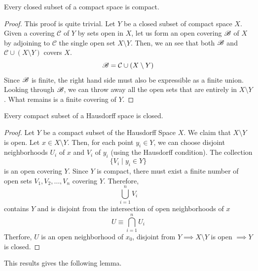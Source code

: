     \begin{theorem}
      Every closed subset of a compact space is compact. 
    \end{theorem}
    \begin{proof}
      This proof is quite trivial. Let $Y$ be a closed subset of compact space $X$. Given a covering $\mathcal{C}$ of $Y$ by sets open in $X$, let us form an open covering $\operatorname{\mathscr{B}}$ of $X$ by adjoining to $\mathcal{C}$ the single open set $X \setminus Y$. Then, we an see that both $\operatorname{\mathscr{B}}$ and $\mathcal{C} \cup (X \setminus Y)$ covers $X$. 
      \begin{equation}
        \operatorname{\mathscr{B}} = \mathcal{C} \cup (X \setminus Y)
      \end{equation}
      Since $\operatorname{\mathscr{B}}$ is finite, the right hand side must also be expressible as a finite union. Looking through $\operatorname{\mathscr{B}}$, we can throw away all the open sets that are entirely in $X \setminus Y$. What remains is a finite covering of $Y$. 
    \end{proof}

    \begin{theorem}
      Every compact subset of a Hausdorff space is closed. 
    \end{theorem}
    \begin{proof}
      Let $Y$ be a compact subset of the Hausdorff Space $X$. We claim that $X \setminus Y$ is open. Let $x \in X \setminus Y$. Then, for each point $y_i \in Y$, we can choose disjoint neighborhoods $U_i$ of $x$ and $V_i$ of $y_i$ (using the Hausdorff condition). The collection 
      \begin{equation}
        \{V_i \; | \; y_i \in Y\}
      \end{equation}
      is an open covering $Y$. Since $Y$ is compact, there must exist a finite number of open sets $V_1, V_2, \ldots , V_n$ covering $Y$. Therefore, 
      \begin{equation}
        \bigcup_{i=1}^n V_i
      \end{equation}
      contains $Y$ and is disjoint from the intersection of open neighborhoods of $x$
      \begin{equation}
        U \equiv \bigcap_{i=1}^n U_i
      \end{equation}
      Therfore, $U$ is an open neighborhood of $x_0$, disjoint from $Y \implies X \setminus Y$ is open $\implies Y$ is closed.
    \end{proof}

    This results gives the following lemma. 

